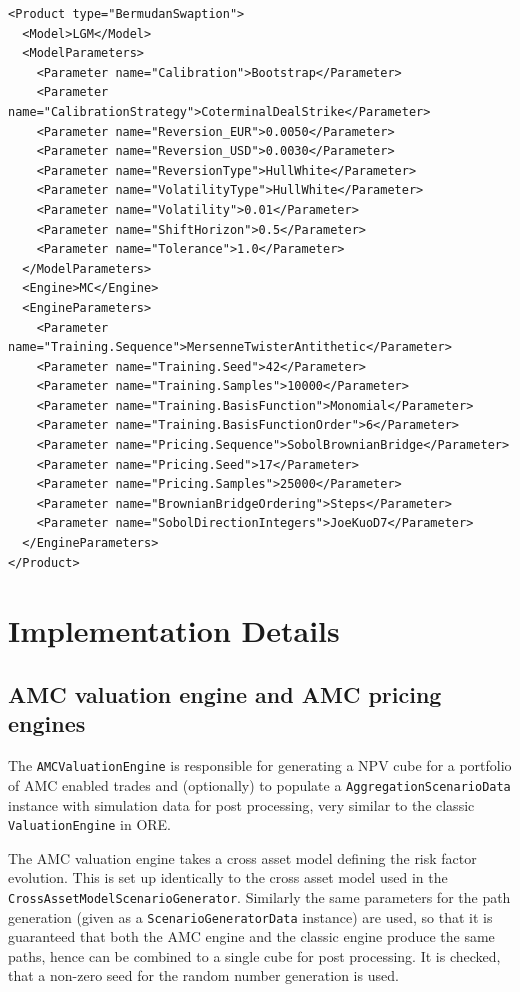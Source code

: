 \documentclass[12pt, a4paper]{article}
\begin{document}
\begin{verbatim}
<Product type="BermudanSwaption">
  <Model>LGM</Model>
  <ModelParameters>
    <Parameter name="Calibration">Bootstrap</Parameter>
    <Parameter name="CalibrationStrategy">CoterminalDealStrike</Parameter>
    <Parameter name="Reversion_EUR">0.0050</Parameter>
    <Parameter name="Reversion_USD">0.0030</Parameter>
    <Parameter name="ReversionType">HullWhite</Parameter>
    <Parameter name="VolatilityType">HullWhite</Parameter>
    <Parameter name="Volatility">0.01</Parameter>
    <Parameter name="ShiftHorizon">0.5</Parameter>
    <Parameter name="Tolerance">1.0</Parameter>
  </ModelParameters>
  <Engine>MC</Engine>
  <EngineParameters>
    <Parameter name="Training.Sequence">MersenneTwisterAntithetic</Parameter>
    <Parameter name="Training.Seed">42</Parameter>
    <Parameter name="Training.Samples">10000</Parameter>
    <Parameter name="Training.BasisFunction">Monomial</Parameter>
    <Parameter name="Training.BasisFunctionOrder">6</Parameter>
    <Parameter name="Pricing.Sequence">SobolBrownianBridge</Parameter>
    <Parameter name="Pricing.Seed">17</Parameter>
    <Parameter name="Pricing.Samples">25000</Parameter>
    <Parameter name="BrownianBridgeOrdering">Steps</Parameter>
    <Parameter name="SobolDirectionIntegers">JoeKuoD7</Parameter>
  </EngineParameters>
</Product>
\end{verbatim}

\section{Implementation Details}\label{sec:implementation_details}

\subsection{AMC valuation engine and AMC pricing engines}

The \verb+AMCValuationEngine+ is responsible for generating a NPV cube for a portfolio of AMC enabled trades and
(optionally) to populate a \verb+AggregationScenarioData+ instance with simulation data for post processing, very
similar to the classic \verb+ValuationEngine+ in ORE.

The AMC valuation engine takes a cross asset model defining the risk factor evolution. This is set up identically to the
cross asset model used in the \\ \verb+CrossAssetModelScenarioGenerator+. Similarly the same parameters for the path
generation (given as a \verb+ScenarioGeneratorData+ instance) are used, so that it is guaranteed that both the AMC
engine and the classic engine produce the same paths, hence can be combined to a single cube for post processing. It is
checked, that a non-zero seed for the random number generation is used.
\end{document}
